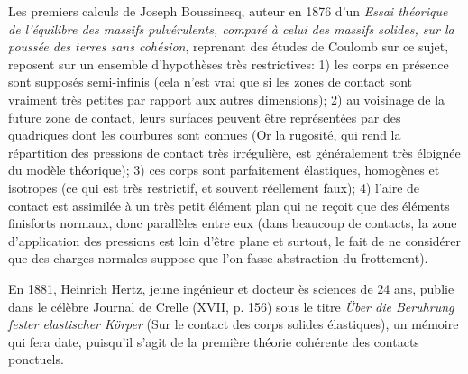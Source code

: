 \medskip
\begin{histoire}%
Les premiers calculs de Joseph Boussinesq,
auteur en 1876 d'un \emph{Essai théorique de l'équilibre des massifs pulvérulents, comparé à celui des
massifs solides, sur la poussée des terres sans cohésion}, reprenant des études de
Coulomb sur ce sujet, reposent sur
un ensemble d'hypothèses très restrictives:
1) les corps en présence sont supposés semi-infinis (cela n'est vrai que si les zones de contact sont
vraiment très petites par rapport aux autres dimensions);
2) au voisinage de la future zone de contact, leurs surfaces peuvent être représentées par des
quadriques dont les courbures sont connues (Or la rugosité, qui rend la répartition des pressions
de contact très irrégulière, est généralement très éloignée du modèle théorique);
3) ces corps sont parfaitement élastiques, homogènes et isotropes (ce qui est très restrictif,
et souvent réellement faux);
4) l'aire de contact est assimilée à un très petit élément plan qui ne reçoit que des éléments finisforts
normaux, donc parallèles entre eux (dans beaucoup de contacts, la zone d'application des pressions
est loin d'être plane et surtout, le fait de ne considérer que des charges normales suppose que l'on
fasse abstraction du frottement).

\medskip
En 1881, Heinrich Hertz, jeune ingénieur et
docteur ès sciences de 24 ans, publie dans le célèbre Journal de Crelle (XVII, p. 156) sous le titre
\emph{Über die Beruhrung fester elastischer Körper} (Sur le contact des corps solides élastiques),
un mémoire qui fera date, puisqu'il s'agit de la première théorie cohérente des contacts ponctuels.

\medskip
{}


\end{histoire}
